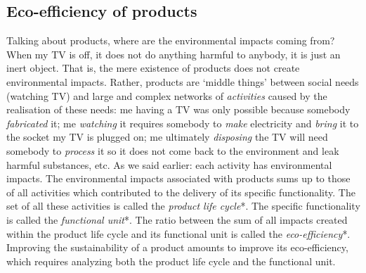 \documentclass{article}
\begin{document}
\subsection{Eco-efficiency of products}
\label{sec:tbd}

Talking about products, where are the environmental impacts coming from? When my TV is off, it does not do anything harmful to anybody, it is just an inert object. That is, the mere existence of products does not create environmental impacts. Rather, products are `middle things' between social needs (watching TV) and large and complex networks of \emph{activities} caused by the realisation of these needs: me having a TV was only possible because somebody \emph{fabricated} it; me \emph{watching} it requires somebody to \emph{make} electricity and \emph{bring} it to the socket my TV is plugged on; me ultimately \emph{disposing} the TV will need somebody to \emph{process} it so it does not come back to the environment and leak harmful substances, etc. As we said earlier: each activity has environmental impacts. The environmental impacts associated with products sums up to those of all activities which contributed to the delivery of its specific functionality. The set of all these activities is called the \emph{product life cycle}*. The specific functionality is called the \emph{functional unit}*. The ratio between the sum of all impacts created within the product life cycle and its functional unit is called the \emph{eco-efficiency}*. Improving the sustainability of a product amounts to improve its eco-efficiency, which requires analyzing both the product life cycle and the functional unit.
\end{document}
